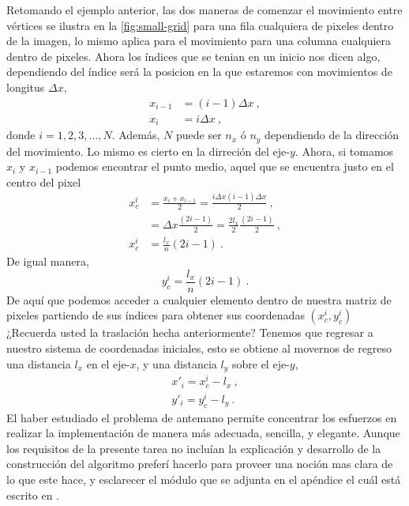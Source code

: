 Retomando el ejemplo anterior, las dos maneras de comenzar el movimiento entre vértices se ilustra en la \cref{fig:small-grid} para una fila cualquiera de pixeles dentro de la imagen, lo mismo aplica para el movimiento para una columna cualquiera dentro de pixeles. Ahora los índices que se tenian en un inicio nos dicen algo, dependiendo del índice será la posicion en la que estaremos con movimientos de longitus $\Delta x$,
\begin{equation*}
    \begin{split}
        x_{i-1} & = (i - 1) \Delta x\ , \\
        x_{i} & = i \Delta x\ ,
    \end{split}
\end{equation*}
donde $i=1, 2, 3, \ldots, N$. Además, $N$ puede ser $n_x$ ó $n_y$ dependiendo de la dirección del movimiento. Lo mismo es cierto en la dirreción del eje-$y$. Ahora, si tomamos $x_i$ y $x_{i-1}$ podemos encontrar el punto medio, aquel que se encuentra justo en el centro del pixel
\begin{equation*}
    \begin{split}
        x_{c}^{i} & = \frac{x_i + x_{i-1}}{2} = \frac{i \Delta x (i-1) \Delta x}{2}\ , \\
        & = \Delta x \frac{(2i - 1)}{2} = \frac{2 l_x}{2} \frac{(2i - 1)}{2}\ ,\\
        x_{c}^{i} & = \frac{l_x}{n} (2i - 1)\ .
    \end{split}
\end{equation*}
De igual manera,
\begin{equation*}
    y_{c}^{i} = \frac{l_x}{n} (2i - 1)\ .
\end{equation*}
De aquí que podemos acceder a cualquier elemento dentro de nuestra matriz de pixeles partiendo de sus índices para obtener sus coordenadas $(x_{c}^{i}, y_{c}^{i})$ ¿Recuerda usted la traslación hecha anteriormente? Tenemos que regresar a nuestro sistema de coordenadas iniciales, esto se obtiene al movernos de regreso una distancia $l_x$ en el eje-$x$, y una distancia $l_y$ sobre el eje-$y$,
\begin{equation}
    \begin{split}
        x'_i = x_{c}^i - l_x\ , \\
        y'_i = y_{c}^i - l_y\ .
    \end{split}
\end{equation}
El haber estudiado el problema de antemano permite concentrar los esfuerzos en realizar la implementación de manera más adecuada, sencilla, y elegante. Aunque los requisitos de la presente tarea no incluían la explicación y desarrollo de la construcción del algoritmo preferí hacerlo para proveer una noción mas clara de lo que este hace, y esclarecer el módulo que se adjunta en el apéndice el cuál está escrito en .

